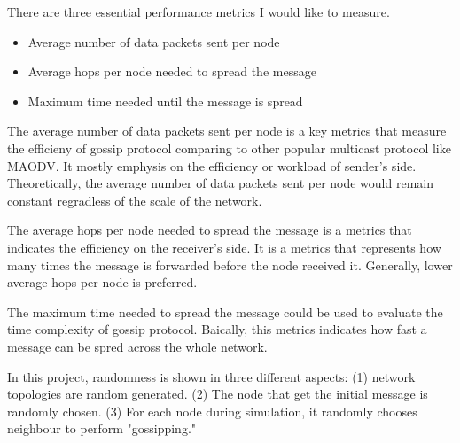 


There are three essential performance metrics I would like to measure. 

\begin{itemize}
	\item Average number of data packets sent per node
	\item Average hops per node needed to spread the message
	\item Maximum time needed until the message is spread
\end{itemize}

The average number of data packets sent per node is a key metrics that measure the efficieny of gossip protocol comparing to other popular multicast protocol like MAODV. It mostly emphysis on the efficiency or workload of sender's side. Theoretically, the average number of data packets sent per node would remain constant regradless of the scale of the network. 

The average hops per node needed to spread the message is a metrics that indicates the efficiency on the receiver's side. It is a metrics that represents how many times the message is forwarded before the node received it. Generally, lower average hops per node is preferred. 

The maximum time needed to spread the message could be used to evaluate the time complexity of gossip protocol. Baically, this metrics indicates how fast a message can be spred across the whole network.  

In this project, randomness is shown in three different aspects: (1) network topologies are random generated. (2) The node that get the initial message is randomly chosen. (3) For each node during simulation, it randomly chooses neighbour to perform "gossipping." 

